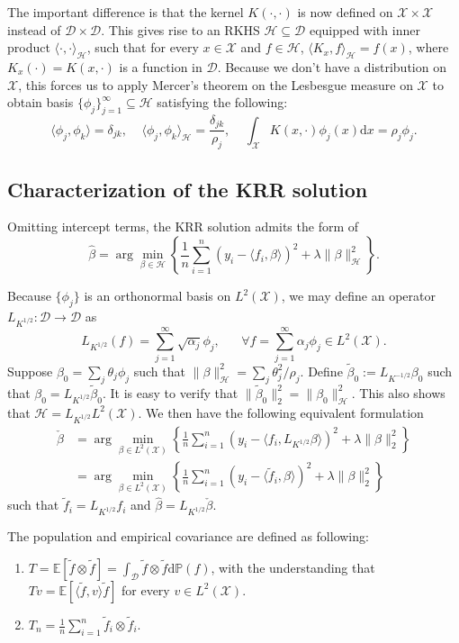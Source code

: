 \documentclass[11pt,a4paper]{article}
\renewcommand{\hat}{\widehat}
\renewcommand{\tilde}{\widetilde}
\theoremstyle{definition}
\theoremstyle{plain}
\theoremstyle{remark}
\newcommand{\mX}{\mathcal X}
\newcommand{\mD}{\mathcal D}
\newcommand{\bP}{\mathbb P}
\newcommand{\lx}{L^2(\mX)}
\newcommand{\ud}{\mathrm d}
\newcommand{\mH}{\mathcal H}
\begin{document}
The important difference is that the kernel $K(\cdot,\cdot)$ is now defined on $\mX\times \mX$ instead of $\mD\times \mD$. This gives rise to an RKHS $\mH\subseteq\mD$ equipped with inner product $\langle\cdot,\cdot\rangle_{\mH}$, such that for every $x\in\mX$ and $f\in\mH$, $\langle K_x,f\rangle_{\mH}=f(x)$, where $K_x(\cdot)=K(x,\cdot)$ is a function in $\mD$.
Because we don't have a distribution on $\mX$, this forces us to apply Mercer's theorem on the Lesbesgue measure on $\mX$ to obtain basis $\{\phi_j\}_{j=1}^{\infty}\subseteq\mH$ satisfying the following:
$$
\langle\phi_j,\phi_k\rangle = \delta_{jk},\;\;\;\; \langle\phi_j,\phi_k\rangle_{\mH} = \frac{\delta_{jk}}{\rho_j}, \;\;\;\; \int_{\mX}K(x,\cdot)\phi_j(x)\ud x = \rho_j\phi_j.
$$

\subsection{Characterization of the KRR solution}

Omitting intercept terms, the KRR solution admits the form of 
$$
\hat\beta = \arg\min_{\beta\in\mH}\left\{\frac{1}{n}\sum_{i=1}^n (y_i-\langle f_i,\beta\rangle)^2 +\lambda \|\beta\|_{\mH}^2\right\}.
$$

Because $\{\phi_j\}$ is an orthonormal basis on $\lx$, we may define an operator $L_{K^{1/2}}:\mD\to\mD$ as 
$$
L_{K^{1/2}}(f) = \sum_{j=1}^{\infty}\sqrt{\alpha_j}\phi_j,\;\;\;\;\;\;\forall f = \sum_{j=1}^{\infty}\alpha_j\phi_j\in\lx.
$$
Suppose $\beta_0 = \sum_j\theta_j\phi_j$ such that $\|\beta\|_{\mH}^2 = \sum_j \theta_j^2/\rho_j$. Define $\tilde\beta_0 := L_{K^{-1/2}}\beta_0$ such that $\beta_0 = L_{K^{1/2}}\tilde\beta_0$.
It is easy to verify that $\|\tilde\beta_0\|_2^2 = \|\beta_0\|_{\mH}^2$. This also shows that $\mH = L_{K^{1/2}}\lx$.
We then have the following equivalent formulation
\begin{align*}
\check\beta &= \arg\min_{\beta\in\lx}\left\{\frac{1}{n}\sum_{i=1}^n (y_i-\langle f_i,L_{K^{1/2}}\beta\rangle)^2 + \lambda \|\beta\|_2^2\right\}\\
&= \arg\min_{\beta\in\lx}\left\{\frac{1}{n}\sum_{i=1}^n (y_i-\langle \tilde f_i,\beta\rangle)^2 + \lambda \|\beta\|_2^2\right\}
\end{align*}
such that $\tilde f_i=L_{K^{1/2}}f_i$ and $\hat\beta = L_{K^{1/2}}\check\beta$.

The population and empirical covariance are defined as following:
\begin{enumerate}
\item $T = \mathbb E[\tilde f\otimes \tilde f] = \int_{\mD} \tilde f\otimes \tilde f\ud\bP(f)$, with the understanding that $Tv=\mathbb E[\langle\tilde f,v\rangle\tilde f]$ for every $v\in\lx$.
\item $T_n = \frac{1}{n}\sum_{i=1}^n \tilde f_i\otimes\tilde f_i$.
\end{enumerate}
\end{document}
